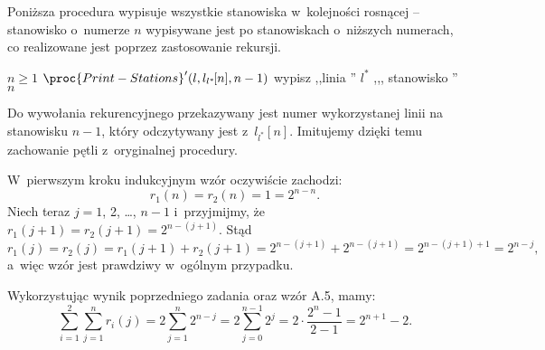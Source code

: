 
\exercise %
Poniższa procedura wypisuje wszystkie stanowiska w~kolejności rosnącej -- stanowisko o~numerze $n$ wypisywane jest po stanowiskach o~niższych numerach, co realizowane jest poprzez zastosowanie rekursji.
\begin{codebox}
\li	\If $n\ge1$
\li	\Then $\proc{Print-Stations}'(l,l_{l^*\!}[n],n-1)$
\li		wypisz ,,linia '' $l^*\!$ ,,{}, stanowisko '' $n$
	\End
\end{codebox}
Do wywołania rekurencyjnego przekazywany jest numer wykorzystanej linii na stanowisku $n-1$, który odczytywany jest z~$l_{l^*\!}[n]$.
Imitujemy dzięki temu zachowanie pętli z~oryginalnej procedury.

\exercise %
W~pierwszym kroku indukcyjnym wzór oczywiście zachodzi:
\[
	r_1(n) = r_2(n) = 1 = 2^{n-n}.
\]
Niech teraz $j=1$, 2, \dots, $n-1$ i~przyjmijmy, że $r_1(j+1)=r_2(j+1)=2^{n-(j+1)}$.
Stąd
\[
	r_1(j) = r_2(j) = r_1(j+1)+r_2(j+1) = 2^{n-(j+1)}+2^{n-(j+1)} = 2^{n-(j+1)+1} = 2^{n-j},
\]
a~więc wzór jest prawdziwy w~ogólnym przypadku.

\exercise %
Wykorzystując wynik poprzedniego zadania oraz wzór A.5, mamy:
\[
	\sum_{i=1}^2\sum_{j=1}^nr_i(j) = 2\sum_{j=1}^n2^{n-j} = 2\sum_{j=0}^{n-1}2^j = 2\cdot\frac{2^n-1}{2-1} = 2^{n+1}-2.
\]

\exercise %
\exercise %
